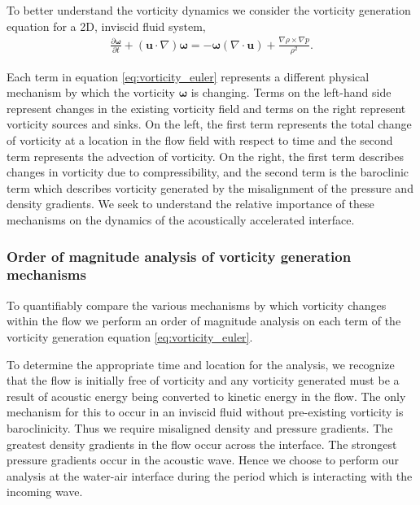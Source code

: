 To better understand the vorticity dynamics we consider the vorticity
generation equation for a 2D, inviscid fluid system,
\begin{align} \label{eq:vorticity_euler}
  \frac{\partial \boldsymbol{\omega}}{\partial t}+\left(\boldsymbol{u}\cdot\nabla\right)\boldsymbol{\omega} =%
  - \boldsymbol{\omega}\left(\nabla\cdot\boldsymbol{u}\right) + \frac{\nabla\rho\times\nabla p}{\rho^2}.%
\end{align}

Each term in equation \eqref{eq:vorticity_euler} represents a
different physical mechanism by which the vorticity
$\boldsymbol{\omega}$ is changing. Terms on the left-hand side
represent changes in the existing vorticity field and terms on the
right represent vorticity sources and sinks. On the left, the first
term represents the total change of vorticity at a location in the
flow field with respect to time and the second term represents the
advection of vorticity. On the right, the first term describes changes
in vorticity due to compressibility, and the second term is the
baroclinic term which describes vorticity generated by the
misalignment of the pressure and density gradients. We
seek to understand the relative importance of these mechanisms on the
dynamics of the acoustically accelerated interface.
% 
% 
\subsubsection{Order of magnitude analysis of vorticity generation mechanisms}
\label{subsubsec:oom_analysis}
To quantifiably compare the various mechanisms by which vorticity
changes within the flow we perform an order of magnitude analysis on
each term of the vorticity generation equation
\eqref{eq:vorticity_euler}.

To determine the appropriate time and location for the analysis, we
recognize that the flow is initially free of vorticity and any
vorticity generated must be a result of acoustic energy being
converted to kinetic energy in the flow. The only mechanism for
this to occur in an inviscid fluid without pre-existing vorticity is
baroclinicity. Thus we require misaligned density and pressure
gradients. The greatest density gradients in the flow occur across the
interface. The strongest pressure gradients occur in the acoustic
wave. Hence we choose to perform our analysis at the water-air
interface during the period which is interacting with the incoming
wave.

